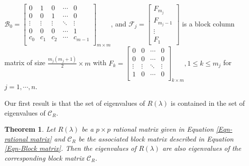 \documentclass[12pt, reqno]{amsart}
\newtheorem{theorem}{Theorem}[section]
\theoremstyle{definition}
\theoremstyle{remark}
\numberwithin{equation}{section}
\begin{document}
$\mathcal{B}_0 = \begin{bmatrix}
0 & 1 & 0 & \cdots & 0\\
0 & 0 & 1 & \cdots & 0\\
\vdots & \vdots & \vdots & \ddots & \vdots\\
0 & 0 & 0 & \cdots & 1\\
c_0 & c_1 & c_2 & \cdots & c_{m-1}\\ 
\end{bmatrix}_{m \times m}$, and
$\mathcal{F}_j = \begin{bmatrix}
F_{m_j} \\
F_{m_j-1} \\
\vdots \\
F_1
\end{bmatrix}$ is a block column matrix of size $\displaystyle \frac{m_j(m_j+1)}{2} 
\times m$ with $ F_k =\begin{bmatrix}
0 & 0 & \cdots & 0\\
0 & 0 & \cdots & 0\\
\vdots & \vdots & \ddots & \vdots \\
1 & 0 & \cdots & 0 \\
\end{bmatrix}_{k \times m}, 1 \leq k \leq m_j$ for $j = 1,\cdots, n$.

\medskip
Our first result is that the set of eigenvalues of $R(\lambda)$ is contained 
in the set of eigenvalues of $\mathcal{C}_R$.

\begin{theorem}\label{Thm- eigenvalues- matrix rational function}
Let $R(\lambda)$ be a $p\times p$ rational matrix given in Equation 
\eqref{Eqn- rational matrix} and $\mathcal{C}_R$ be the associated block 
matrix described in Equation \eqref{Eqn-Block matrix}. Then the eigenvalues 
of $R(\lambda)$ are also eigenvalues of the corresponding block matrix
$\mathcal{C}_R$.
\end{theorem}
\end{document}
